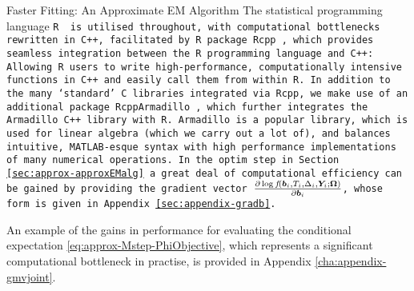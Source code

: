 \begin{chapter}{\label{cha:approx}Faster Fitting: An Approximate EM Algorithm}
  The statistical programming language \tt{R} \citep{R-R} is utilised throughout, with computational bottlenecks rewritten in \tt{C++}, facilitated by \tt{R} package \tt{Rcpp} \citep{R-Rcpp}, which provides seamless integration between the R programming language and \tt{C++}: Allowing \tt{R} users to write high-performance, computationally intensive functions in \tt{C++} and easily call them from within \tt{R}. In addition to the many `standard' \tt{C} libraries integrated via \tt{Rcpp}, we make use of an additional package \tt{RcppArmadillo} \citep{R-RcppArmadillo}, which further integrates the Armadillo \tt{C++} library with \tt{R}. Armadillo is a popular library, which is used for linear algebra (which we carry out a lot of), and balances intuitive, \tt{MATLAB}-esque syntax with high performance implementations of many numerical operations. In the \tt{optim} step in Section \ref{sec:approx-approxEMalg} a great deal of computational efficiency can be gained by providing the gradient vector $\frac{\partial\log f\!\left(\bm{b}_i, T_i, \Delta_i, \bm{Y}_i; \bm{\mathrm{\Omega}}\right)}{\partial\bm{b}_i}$, whose form is given in Appendix \ref{sec:appendix-gradb}.
  
  An example of the gains in performance for evaluating the conditional expectation \eqref{eq:approx-Mstep-PhiObjective}, which represents a significant computational bottleneck in practise, is provided in Appendix \ref{cha:appendix-gmvjoint}. 

\end{chapter}